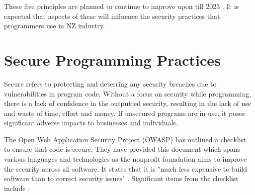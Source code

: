 \par These five principles are planned to continue to improve upon till 2023 \cite{securitystrat}. It is expected that aspects of these will influence the security practices that programmers use in NZ industry.

\section{Secure Programming Practices}

Secure refers to protecting and deterring any security breaches due to vulnerabilities in program code. Without a focus on security while programming, there is a lack of confidence in the outputted security, resulting in the lack of use and waste of time, effort and money. If unsecured programs are in use, it poses significant adverse impacts to businesses and individuals.  
\newline
\par The Open Web Application Security Project (OWASP) has outlined a checklist to ensure that code is secure. They have provided this document which spans various languages and technologies as the nonprofit foundation aims to improve the security across all software. It states that it is "much less expensive to build software than to correct security issues" \cite{owasp}.
\newline
\newline
Significant items from the checklist include \cite{owasp}: 

